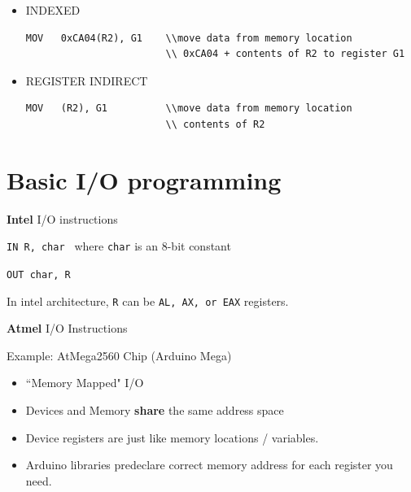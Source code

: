 \begin{itemize}
\item INDEXED
\begin{verbatim}
MOV   0xCA04(R2), G1    \\move data from memory location
                        \\ 0xCA04 + contents of R2 to register G1
\end{verbatim}

\item REGISTER INDIRECT
\begin{verbatim}
MOV   (R2), G1          \\move data from memory location
                        \\ contents of R2
\end{verbatim}

\end{itemize}




\section{Basic I/O programming}

{\bf Intel} I/O instructions

{\tt IN         R, char }
where {\tt char} is an 8-bit constant

{\tt OUT        char, R }

In intel architecture, {\tt R} can be {\tt AL, AX, or EAX} registers.




{\bf Atmel} I/O Instructions 

Example:   AtMega2560 Chip (Arduino Mega)

\begin{itemize}

    \item ``Memory Mapped" I/O
    \item Devices and Memory {\bf share } the same address space
    \item Device registers are just like memory locations / variables. 
    \item Arduino libraries predeclare correct memory address for each register you need. 
\end{itemize}
%

